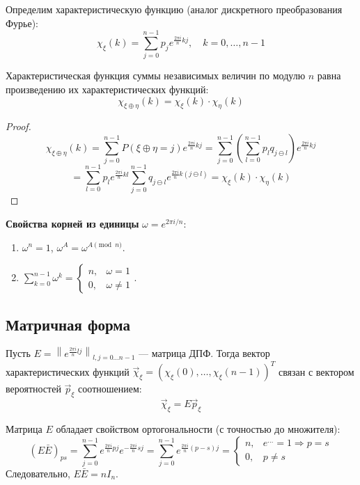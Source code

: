 Определим характеристическую функцию (аналог дискретного преобразования Фурье):
$$ \chi_\xi(k) = \sum_{j=0}^{n-1} p_j e^{\frac{2\pi i}{n} kj}, \quad k=0, \dots, n-1 $$

\begin{theorem}
Характеристическая функция суммы независимых величин по модулю $n$ равна произведению их характеристических функций:
$$ \chi_{\xi \oplus \eta}(k) = \chi_\xi(k) \cdot \chi_\eta(k) $$
\end{theorem}

\begin{proof}
$$ \chi_{\xi \oplus \eta}(k) = \sum_{j=0}^{n-1} P(\xi \oplus \eta = j) e^{\frac{2\pi i}{n} kj} = \sum_{j=0}^{n-1} \left( \sum_{l=0}^{n-1} p_l q_{j \ominus l} \right) e^{\frac{2\pi i}{n} kj} $$
$$ = \sum_{l=0}^{n-1} p_l e^{\frac{2\pi i}{n} kl} \sum_{j=0}^{n-1} q_{j \ominus l} e^{\frac{2\pi i}{n} k(j \ominus l)} = \chi_\xi(k) \cdot \chi_\eta(k) $$
\end{proof}

\textbf{Свойства корней из единицы} $\omega = e^{2\pi i / n}$:
\begin{enumerate}
    \item $\omega^n = 1$, $\omega^A = \omega^{A \pmod n}$.
    \item $\sum_{k=0}^{n-1} \omega^k = \begin{cases} n, & \omega=1 \\ 0, & \omega \neq 1 \end{cases}$.
\end{enumerate}

\subsection{Матричная форма}

Пусть $E = \left\| e^{\frac{2\pi i}{n} lj} \right\|_{l,j=0 \dots n-1}$ --- матрица ДПФ.
Тогда вектор характеристических функций $\vec{\chi}_\xi = (\chi_\xi(0), \dots, \chi_\xi(n-1))^T$ связан с вектором вероятностей $\vec{p}_\xi$ соотношением:
$$ \vec{\chi}_\xi = E \vec{p}_\xi $$

Матрица $E$ обладает свойством ортогональности (с точностью до множителя):
$$ (E \bar{E})_{ps} = \sum_{j=0}^{n-1} e^{\frac{2\pi i}{n} pj} e^{-\frac{2\pi i}{n} sj} = \sum_{j=0}^{n-1} e^{\frac{2\pi i}{n} (p-s)j} = \begin{cases} n, & e^{\dots}=1 \Rightarrow p=s \\ 0, & p \neq s \end{cases} $$
Следовательно, $E \bar{E} = n I_n$.


